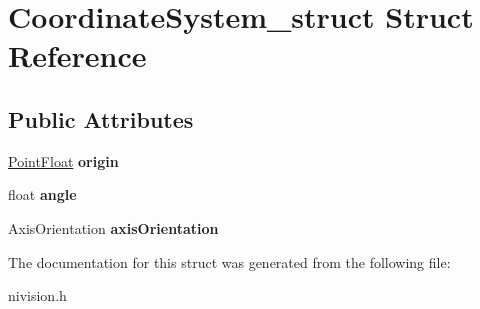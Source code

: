 \hypertarget{structCoordinateSystem__struct}{\section{\-Coordinate\-System\-\_\-struct \-Struct \-Reference}
\label{structCoordinateSystem__struct}
}
\subsection*{\-Public \-Attributes}
\begin{DoxyCompactItemize}
\item 
\hypertarget{structCoordinateSystem__struct_a42519a5dfb0e6c73e3893e90e64e5367}{\hyperlink{structPointFloat__struct}{\-Point\-Float} {\bfseries origin}}\label{structCoordinateSystem__struct_a42519a5dfb0e6c73e3893e90e64e5367}

\item 
\hypertarget{structCoordinateSystem__struct_a9e32cbefe79fe2ad057bac9812ce0f59}{float {\bfseries angle}}\label{structCoordinateSystem__struct_a9e32cbefe79fe2ad057bac9812ce0f59}

\item 
\hypertarget{structCoordinateSystem__struct_ae77bb01a0f51a14daed0c254c18cee43}{\-Axis\-Orientation {\bfseries axis\-Orientation}}\label{structCoordinateSystem__struct_ae77bb01a0f51a14daed0c254c18cee43}

\end{DoxyCompactItemize}


\-The documentation for this struct was generated from the following file\-:\begin{DoxyCompactItemize}
\item 
nivision.\-h\end{DoxyCompactItemize}
